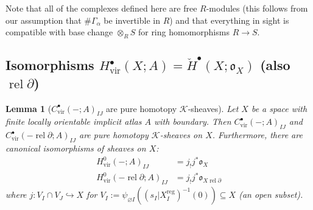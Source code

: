 \documentclass[12pt]{article}
\newtheorem{lemma}[theorem]{Lemma}
\theoremstyle{definition}
\theoremstyle{remark}
\numberwithin{equation}{subsection}
\newcommand{\K}{\mathcal K}
\newcommand{\oo}{\mathfrak o}
\newcommand{\cH}{\check H}
\newcommand{\vir}{\mathrm{vir}}
\newcommand{\reg}{\mathrm{reg}}
\newcommand{\rel}{\operatorname{rel}}
\begin{document}
Note that all of the complexes defined here are free $R$-modules (this follows from our assumption that $\#\Gamma_\alpha$ be invertible in $R$) and that everything in sight is compatible with base change $\otimes_RS$ for ring homomorphisms $R\to S$.

\subsection{Isomorphisms \texorpdfstring{$H^\bullet_\vir(X;A)=\cH^\bullet(X;\oo_X)$}{H\_vir(X;A)=H(X;o\_X)} (also \texorpdfstring{$\rel\partial$}{rel d})}\label{Fsheafcechsimplesec}

\begin{lemma}[$C^\bullet_\vir(-;A)_{IJ}$ are pure homotopy $\K$-sheaves]\label{CSTpure}
Let $X$ be a space with finite locally orientable implicit atlas $A$ with boundary.  Then $C^\bullet_\vir(-;A)_{IJ}$ and $C^\bullet_\vir(-\rel\partial;A)_{IJ}$ are pure homotopy $\K$-sheaves on $X$.  Furthermore, there are canonical isomorphisms of sheaves on $X$:
\begin{align}
\label{EisoI}H^0_\vir(-;A)_{IJ}&=j_!j^\ast\oo_X\\
\label{EisoII}H^0_\vir(-\rel\partial;A)_{IJ}&=j_!j^\ast\oo_{X\rel\partial}
\end{align}
where $j:V_I\cap V_J\hookrightarrow X$ for $V_I:=\psi_{\varnothing I}((s_I|X_I^\reg)^{-1}(0))\subseteq X$ (an open subset).
\end{lemma}
\end{document}
